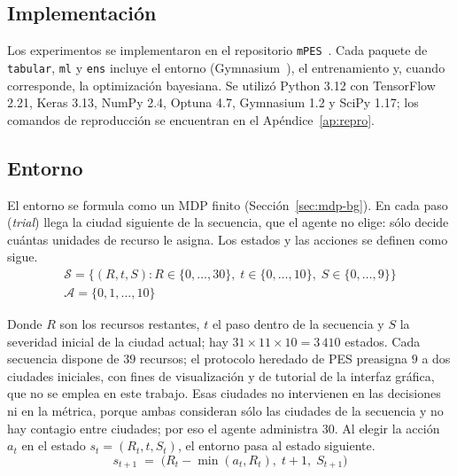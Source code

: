 \documentclass[../00_Main/Main.tex]{subfiles}
\begin{document}
\label{sec:methods}

\subsection{Implementaci\'on}

Los experimentos se implementaron en el repositorio
\texttt{mPES}~\citep{mPES2026}. Cada paquete de \texttt{tabular},
\texttt{ml} y \texttt{ens} incluye el entorno (Gymnasium~\citep{Towers2024}),
el entrenamiento y, cuando
corresponde, la optimizaci\'on bayesiana. Se utiliz\'o Python 3.12 con
TensorFlow 2.21, Keras 3.13, NumPy 2.4, Optuna 4.7, Gymnasium 1.2 y
SciPy 1.17; los comandos de reproducci\'on se encuentran en el
Ap\'endice~\ref{ap:repro}.

\subsection{Entorno}\label{sec:env-dyn}

El entorno se formula como un MDP finito (Secci\'on~\ref{sec:mdp-bg}). En
cada paso (\emph{trial}) llega la ciudad siguiente de la secuencia, que el
agente no elige: s\'olo decide cu\'antas unidades de recurso le asigna. Los
estados y las acciones se
definen como sigue.
\begin{equation}
\begin{gathered}
\mathcal{S} = \bigl\{(R, t, S) : R \in \{0, \ldots, 30\},\;
t \in \{0, \ldots, 10\},\; S \in \{0, \ldots, 9\}\bigr\} \\
\mathcal{A} = \{0, 1, \ldots, 10\}
\end{gathered}
\label{eq:state-space}
\end{equation}

Donde $R$ son los recursos restantes, $t$ el paso dentro de la secuencia
y $S$ la severidad inicial de la ciudad actual; hay
$31 \times 11 \times 10 = 3\,410$ estados. Cada secuencia dispone de $39$
recursos; el protocolo heredado de PES preasigna $9$ a dos ciudades
iniciales, con fines de visualizaci\'on y de tutorial de la interfaz
gr\'afica, que no se emplea en este trabajo. Esas ciudades no intervienen
en las decisiones ni en la m\'etrica, porque ambas consideran s\'olo las
ciudades de la secuencia y no hay contagio entre ciudades; por eso el
agente administra $30$. Al elegir la acci\'on $a_t$ en el estado
$s_t = (R_t, t, S_t)$, el entorno pasa al estado siguiente.
\begin{equation}
s_{t+1} \;=\; \bigl(R_t - \min(a_t, R_t),\; t + 1,\; S_{t+1}\bigr)
\label{eq:state-transition}
\end{equation}
\end{document}
